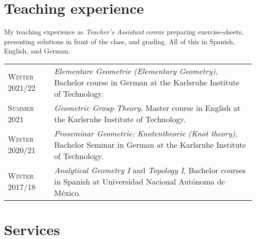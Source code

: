 \documentclass[a4paper,11pt]{article} %
\begin{document}

\section{Teaching experience}

\begin{minipage}{15cm}
My teaching experience as \emph{Teacher's Assistant} covers preparing exercise-sheets, presenting solutions in front of the class, and grading. All of this in Spanish, English, and German.
\end{minipage}

\begin{longtable}{>{\raggedleft\arraybackslash}p{4.2cm}p{10cm}}

    \textsc{Winter 2021/22} & \emph{Elementare Geometrie (Elementary Geometry)}, Bachelor course in German at the Karlsruhe Institute of Technology. \\

    \textsc{Summer 2021} & \emph{Geometric Group Theory}, Master course in English at the Karlsruhe Institute of Technology.\\

    \textsc{Winter 2020/21} & \emph{Proseminar Geometrie: Knotentheorie (Knot theory)}, Bachelor Seminar in German at the Karlsruhe Institute of Technology.\\

    \textsc{Winter 2017/18} & \emph{Analytical Geometry I} and \emph{Topology I}, Bachelor courses in Spanish at Universidad Nacional Autónoma de México.\\
    
\end{longtable}

	
\section{Services}
\end{document}
